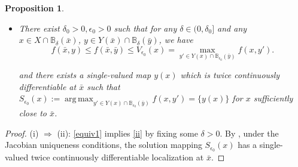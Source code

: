 \documentclass[11pt]{article}
\DeclareMathOperator*{\argmax}{arg\,max}
\numberwithin{equation}{section}
\newtheorem{proposition}{Proposition}[section]
\begin{document}
{\begin{proposition}
\begin{itemize}
\item[(ii)] There exist $\delta_0>0, \epsilon_0>0$ such that for any $\delta\in(0, \delta_0]$ and any $x\in X\cap \mathbb{B}_{\delta}(\bar{x})$, $y\in Y(\bar x)\cap \mathbb{B}_{\delta}(\bar{y})$, we have
\begin{equation} \label{ii} f(\bar{x}, y) \leq f(\bar{x},\bar{y})
				\leq V_{\epsilon_0}(x)=\max_{y' \in  Y(x)\cap\mathbb{B}_{\epsilon_0}(\bar y)} f (x, y' ).
				\end{equation}

and  there exists a single-valued map $y(x)$ which is twice continuously differentiable at $\bar x$ such that $S_{\epsilon_0}(x):=\argmax_{y' \in  Y(x)\cap\mathbb{B}_{\epsilon_0}(\bar y)} f (x, y' )=\{y(x)\}$ for $x$ sufficiently close to  $\bar x$.


\end{itemize}
\end{proposition}
\begin{proof}

(i) $\Rightarrow$ (ii): \eqref{equiv1}  implies \eqref{ii} by fixing some $\delta>0$. By \cite[Lemma 2.1]{DaiZh-2020}, under the Jacobian uniqueness conditions, the solution mapping $S_{\epsilon_0}(x)$ has a single-valued twice continuously differentiable localization at $\bar x$. 


\end{proof}}
\end{document}
